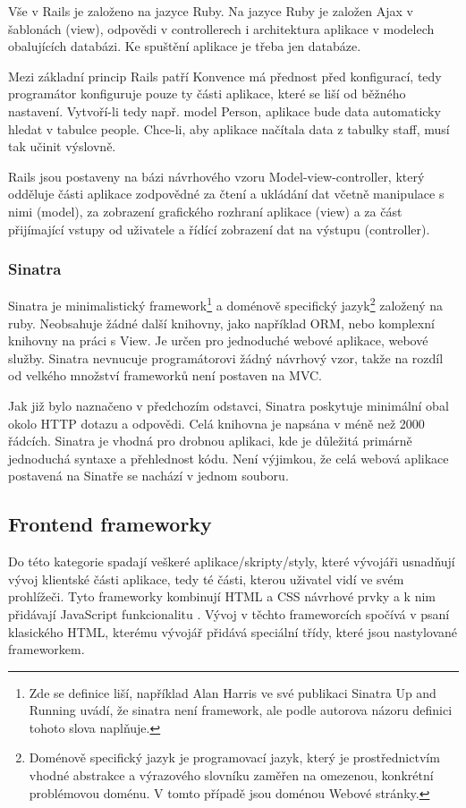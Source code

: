 Vše v Rails je založeno na jazyce Ruby. Na jazyce Ruby je založen Ajax v šablonách (view), odpovědi v controllerech i architektura aplikace v modelech obalujících databázi. Ke spuštění aplikace je třeba jen databáze.

Mezi základní princip Rails patří Konvence má přednost před konfigurací, tedy programátor konfiguruje pouze ty části aplikace, které se liší od běžného nastavení. Vytvoří-li tedy např. model Person, aplikace bude data automaticky hledat v tabulce people. Chce-li, aby aplikace načítala data z tabulky staff, musí tak učinit výslovně.

Rails jsou postaveny na bázi návrhového vzoru Model-view-controller, který odděluje části aplikace zodpovědné za čtení a ukládání dat včetně manipulace s nimi (model), za zobrazení grafického rozhraní aplikace (view) a za část přijímající vstupy od uživatele a řídící zobrazení dat na výstupu (controller).

\subsubsection{Sinatra}
Sinatra je minimalistický framework\footnote{Zde se definice liší, například Alan Harris ve své publikaci Sinatra Up and Running uvádí, že sinatra není framework, ale podle autorova názoru definici tohoto slova naplňuje.} a doménově specifický jazyk\footnote{Doménově specifický jazyk je programovací jazyk, který je prostřednictvím vhodné abstrakce a výrazového slovníku zaměřen na omezenou, konkrétní problémovou doménu. V tomto případě jsou doménou Webové stránky.} založený na ruby. Neobsahuje žádné další knihovny, jako například ORM, nebo komplexní knihovny na práci s View. Je určen pro jednoduché webové aplikace, webové služby. Sinatra nevnucuje programátorovi žádný návrhový vzor, takže na rozdíl od velkého množství frameworků není postaven na MVC.\cite{harris2011sinatra}

Jak již bylo naznačeno v předchozím odstavci, Sinatra poskytuje minimální obal okolo HTTP dotazu a odpovědi. Celá knihovna je napsána v méně než 2000 řádcích\cite{harris2011sinatra}. Sinatra je vhodná pro drobnou aplikaci, kde je důležitá primárně jednoduchá syntaxe a přehlednost kódu. Není výjimkou, že celá webová aplikace postavená na Sinatře se nachází v jednom souboru\cite{harris2011sinatra}.

\subsection{Frontend frameworky}
Do této kategorie spadají veškeré aplikace/skripty/styly, které vývojáři usnadňují vývoj klientské části aplikace, tedy té části, kterou uživatel vidí ve svém prohlížeči. Tyto frameworky kombinují HTML a CSS návrhové prvky a k nim přidávají JavaScript funkcionalitu \cite{website:wiki:bootstrap}\cite{website:boilerplate}. Vývoj v těchto frameworcích spočívá v psaní klasického HTML, kterému vývojář přidává speciální třídy, které jsou nastylované frameworkem\cite{website:wiki:bootstrap}.

